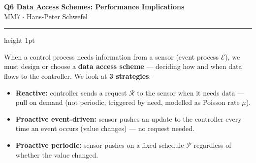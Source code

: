 \documentclass[10pt,a4paper]{article}
\begin{document}

\begin{center}
  {\large\bfseries\color{headernavy} Q6 \textemdash{} Data Access Schemes: Performance Implications}\\[1pt]
  {\small MM7 $\cdot$ Hans-Peter Schwefel}
\end{center}
\vspace{1pt}\hrule height 1pt\vspace{3pt}

\vspace{2pt}

When a control process needs information from a sensor (event process $\mathcal{E}$), we must design or choose a \textbf{data access scheme} --- deciding how and when data flows to the controller. We look at \textbf{3 strategies}:

\begin{itemize}
  \item \textbf{Reactive:} controller sends a request $\mathcal{R}$ to the sensor when it needs data --- pull on demand (not periodic, triggered by need, modelled as Poisson rate $\mu$).
  \item \textbf{Proactive event-driven:} sensor pushes an update to the controller every time an event occurs (value changes) --- no request needed.
  \item \textbf{Proactive periodic:} sensor pushes on a fixed schedule $\mathcal{P}$ regardless of whether the value changed.
\end{itemize}

\end{document}
